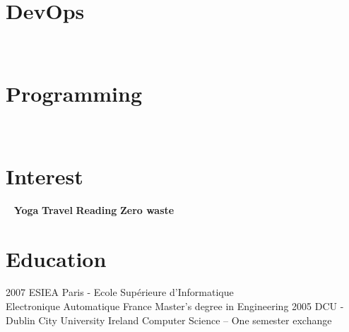 \documentclass[]{friggeri-cv}
\begin{document}
\setlength{\parsep}{\parsepsave}%
\\
\newpage

\begin{aside}
~
~
~
\section{DevOps}
~  
~  
\section{Programming}
~  
    ~
   	\section{Interest}
   	~  
    	\textbf{Yoga}
    	\textbf{Travel} 
    	\textbf{Reading} 
    	\textbf{Zero waste}        	
    	~
\end{aside}
\section{Education}
\begin{entrylist}
	\entry
	{2007}
	{ESIEA Paris - Ecole Supérieure d’Informatique \\  Electronique Automatique}
	{France}
	{Master's degree in Engineering}
	\entry
	{2005}
	{DCU - Dublin City University}
	{Ireland}
	{Computer Science – One semester exchange}	
\end{entrylist}
\end{document}
